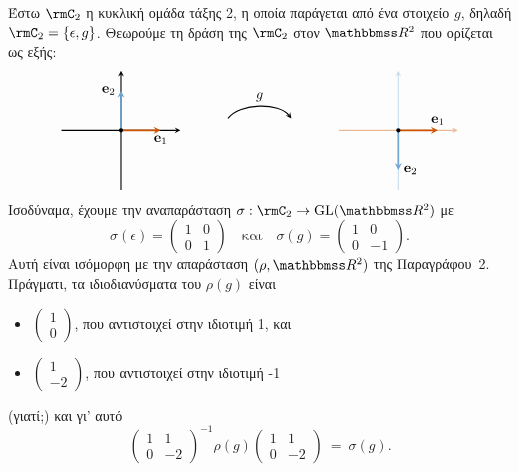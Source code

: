 \documentclass[12pt,a4paper,reqno]{amsart}
\begin{document}
Έστω $\rmC_2$ η κυκλική ομάδα τάξης 2, η οποία παράγεται από ένα στοιχείο $g$, δηλαδή $\rmC_2 = \{\epsilon, g\}$. Θεωρούμε τη δράση της $\rmC_2$ στον $\RR^2$ που ορίζεται ως εξής:
\[
\begin{tikzpicture}[>=stealth, thick, scale=1]
\begin{scope}[shift={(-1,0)}]
    \draw[->] (-1.5,0) -- (1.5,0);
    \draw[->] (0,-1.5) -- (0,1.5);

    \draw[->, burntorange, very thick] (0,0) -- (1,0) node[below] {\textcolor{black}{$\bfe_1$}};
    \draw[->, iceberg, very thick] (0,0) -- (0,1) node[left] {\textcolor{black}{$\bfe_2$}};

    \fill (0,0) circle (1.5pt);
\end{scope}
\begin{scope}[shift={(6,0)}]
    \draw[->,burntorange!40] (-1.5,0) -- (1.5,0);
    \draw[->, iceberg!40] (0,-1.5) -- (0,1.5);

    \draw[->, burntorange, very thick] (0,0) -- (1,0) node[above] {\textcolor{black}{$\bfe_1$}};
    \draw[->, iceberg, very thick] (0,0) -- (0,-1) node[right] {\textcolor{black}{$\bfe_2$}};

    \fill (0,0) circle (1.5pt);
\end{scope}

\draw[->, thick]
(1.7,0.3) .. controls (2,0.7) and (3,0.7) .. (3.3,0.3)
node[midway, above] {$g$};
\end{tikzpicture}
\]
Ισοδύναμα, έχουμε την αναπαράσταση $\sigma : \rmC_2 \to \GL(\RR^2)$ με 
\[
\sigma(\epsilon) = 
\begin{pmatrix}
    1 & 0 \\
    0 & 1
\end{pmatrix}
\quad
\text{και}
\quad
\sigma(g) = 
\begin{pmatrix}
    1 & 0 \\
    0 & -1
\end{pmatrix}.
\]
Αυτή είναι ισόμορφη με την απαράσταση $(\rho, \RR^2)$ της Παραγράφου~2. Πράγματι, τα ιδιοδιανύσματα του $\rho(g)$ είναι
\begin{itemize}
    \item $\left(\begin{smallmatrix}
        1 \\ 0
    \end{smallmatrix}\right)$, που αντιστοιχεί στην ιδιοτιμή 1, και 
    \item $\left(\begin{smallmatrix}
        1 \\ -2
    \end{smallmatrix}\right)$, που αντιστοιχεί στην ιδιοτιμή -1
\end{itemize}
(γιατί;) και γι' αυτό
\[
\begin{pmatrix}
    1 & 1 \\
    0 & -2
\end{pmatrix}^{-1} 
\rho(g) 
\begin{pmatrix}
    1 & 1 \\
    0 & -2
\end{pmatrix}
\ = \
\sigma(g).
\]
\end{document}
